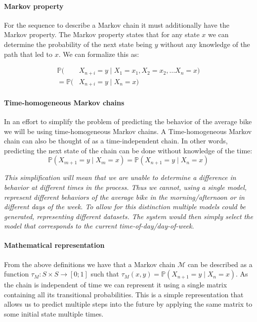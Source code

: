 \paragraph{Markov property}\label{markov:property}
For the sequence to describe a Markov chain it must additionally have the Markov property.
The Markov property states that for any state $x$ we can determine the probability of the next state being $y$ without any knowledge of the path that led to $x$.
We can formalize this as:

\begin{align}\label{markov:eq:markov_prob}
\mathbb{P}(&X_{n+i} = y \mid X_1 = x_1, X_2 = x_2, \dots X_n = x)\nonumber\\
= \mathbb{P}(&X_{n+i} = y \mid X_n = x)
\end{align}

\paragraph{Time-homogeneous Markov chains}
In an effort to simplify the problem of predicting the behavior of the average bike we will be using time-homogeneous Markov chains.
A Time-homogeneous Markov chain can also be thought of as a time-independent chain.
In other words, predicting the next state of the chain can be done without knowledge of the time:
\begin{equation}
\mathbb{P}(X_{m+1} = y \mid X_m = x) = \mathbb{P}(X_{n+1} = y \mid X_n = x)
\end{equation}

\textit{This simplification will mean that we are unable to determine a difference in behavior at different times in the process.
Thus we cannot, using a single model, represent different behaviors of the average bike in the morning/afternoon or in different days of the week.
To allow for this distinction multiple models could be generated, representing different datasets.
The system would then simply select the model that corresponds to the current time-of-day/day-of-week.}

\paragraph{Mathematical representation}
From the above definitions we have that a Markov chain $\mathcal{M}$ can be described as a function $\tau_M:S\times S \rightarrow [0;1]$ such that $\tau_M(x, y) = \mathbb{P}(X_{n + 1} = y \mid X_n = x)$.
As the chain is independent of time we can represent it using a single matrix containing all its transitional probabilities.
This is a simple representation that allows us to predict multiple steps into the future by applying the same matrix to some initial state multiple times.

